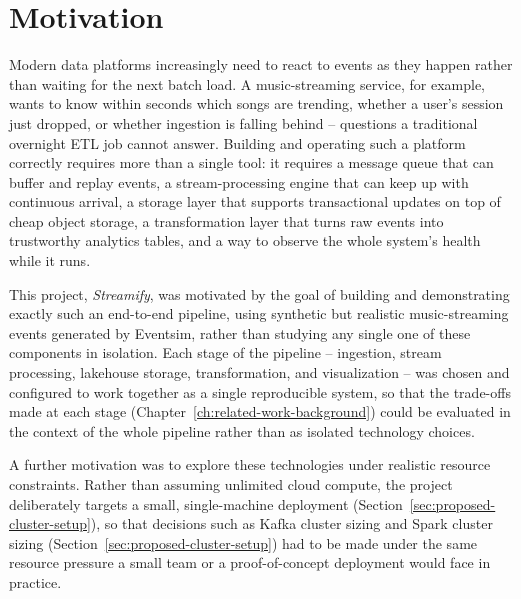 \section{Motivation}

Modern data platforms increasingly need to react to events as they happen rather than waiting for the next batch load. A music-streaming service, for example, wants to know within seconds which songs are trending, whether a user's session just dropped, or whether ingestion is falling behind -- questions a traditional overnight ETL job cannot answer. Building and operating such a platform correctly requires more than a single tool: it requires a message queue that can buffer and replay events, a stream-processing engine that can keep up with continuous arrival, a storage layer that supports transactional updates on top of cheap object storage, a transformation layer that turns raw events into trustworthy analytics tables, and a way to observe the whole system's health while it runs.

This project, \emph{Streamify}, was motivated by the goal of building and demonstrating exactly such an end-to-end pipeline, using synthetic but realistic music-streaming events generated by Eventsim, rather than studying any single one of these components in isolation. Each stage of the pipeline -- ingestion, stream processing, lakehouse storage, transformation, and visualization -- was chosen and configured to work together as a single reproducible system, so that the trade-offs made at each stage (Chapter~\ref{ch:related-work-background}) could be evaluated in the context of the whole pipeline rather than as isolated technology choices.

A further motivation was to explore these technologies under realistic resource constraints. Rather than assuming unlimited cloud compute, the project deliberately targets a small, single-machine deployment (Section~\ref{sec:proposed-cluster-setup}), so that decisions such as Kafka cluster sizing and Spark cluster sizing (Section~\ref{sec:proposed-cluster-setup}) had to be made under the same resource pressure a small team or a proof-of-concept deployment would face in practice.
